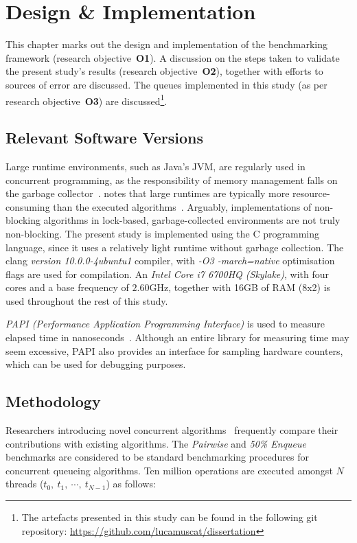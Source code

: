 \chapter{Design \& Implementation\label{chap:design_and_implementation}}
This chapter marks out the design and implementation of the benchmarking
framework (research objective~\textbf{O1}). A discussion on the steps taken to validate the
present study's results (research objective~\textbf{O2}), together
with efforts to sources of error are discussed. The queues implemented in this
study (as per research objective~\textbf{O3}) are discussed\footnote{The
artefacts presented in this study can be found in the following git
repository: \url{https://github.com/lucamuscat/dissertation}}.

\section{Relevant Software Versions}
Large runtime environments, such as Java's JVM, are regularly used in
concurrent programming, as the responsibility of memory management falls on the
garbage collector~\citep{kogan2011wait}. \citeauthor{fog2020optimizing} notes
that large runtimes are typically more resource-consuming than the executed
algorithms~\citep{fog2020optimizing}. Arguably, implementations of non-blocking
algorithms in lock-based, garbage-collected environments are not truly
non-blocking. The present study is implemented using the C programming language, since
it uses a relatively light runtime without garbage collection. The clang
\emph{version 10.0.0-4ubuntu1} compiler, with \emph{-O3 -march=native}
optimisation flags are used for compilation. An \emph{Intel Core i7 6700HQ
(Skylake)}, with four cores and a base frequency of $2.60\text{GHz}$, together
with 16GB of RAM (8x2) is used throughout the rest of this study.

\emph{PAPI (Performance Application Programming Interface)} is used to measure
elapsed time in nanoseconds~\citep{terpstra2010papi}. Although an entire library for measuring time 
may seem excessive, PAPI also provides an interface for
sampling hardware counters, which can be used for debugging purposes.

\section{Methodology\label{sec:design_and_implementation_methodology}}

Researchers introducing novel concurrent
algorithms~\citep{michael1996simple,valois1994queues,kogan2011wait,hoffman2007baskets,yang2016wait}
frequently compare their contributions with existing algorithms. The
\emph{Pairwise} and \emph{50\% Enqueue}
benchmarks are considered to be standard benchmarking procedures for concurrent
queueing algorithms. Ten million operations are
executed amongst $N$ threads ($t_0,~t_1,~\cdots,~t_{N-1}$) as follows: 

